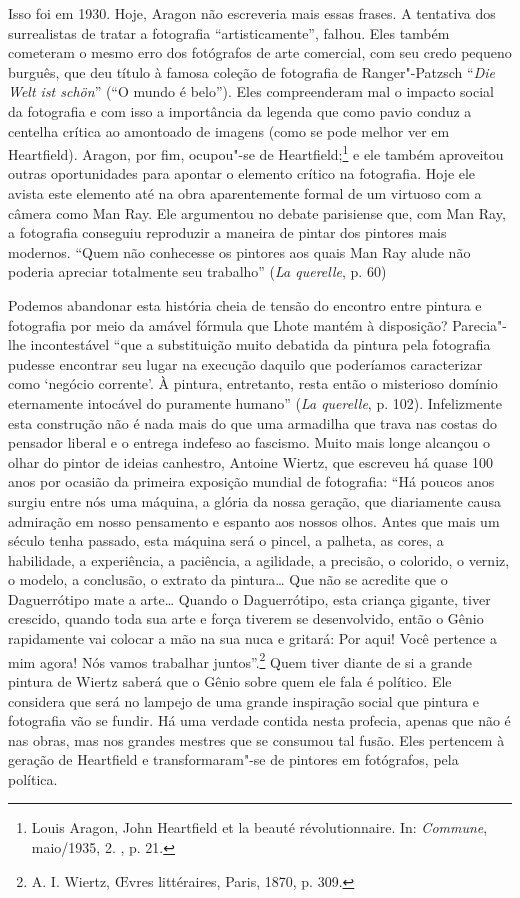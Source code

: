 Isso foi em 1930. Hoje, Aragon não escreveria mais essas frases. A
tentativa dos surrealistas de tratar a fotografia ``artisticamente'',
falhou. Eles também cometeram o mesmo erro dos fotógrafos de arte
comercial, com seu credo pequeno burguês, que deu título à famosa
coleção de fotografia de Ranger"-Patzsch ``\emph{Die Welt ist schön}''
(``O mundo é belo''). Eles compreenderam mal o impacto social da
fotografia e com isso a importância da legenda que como pavio conduz a
centelha crítica ao amontoado de imagens (como se pode melhor ver em
Heartfield). Aragon, por fim, ocupou"-se de Heartfield;\footnote{Louis
  Aragon, John Heartfield et la beauté révolutionnaire. In: \emph{Commune},
  maio/1935, 2. , p. 21.} e ele também aproveitou outras oportunidades
para apontar o elemento crítico na fotografia. Hoje ele avista este
elemento até na obra aparentemente formal de um virtuoso com a câmera
como Man Ray. Ele argumentou no debate parisiense que, com Man Ray, a
fotografia conseguiu reproduzir a maneira de pintar dos pintores mais
modernos. ``Quem não conhecesse os pintores aos quais Man Ray alude não
poderia apreciar totalmente seu trabalho'' (\emph{La querelle}, p. 60)

Podemos abandonar esta história cheia de tensão do encontro entre
pintura e fotografia por meio da amável fórmula que Lhote mantém à
disposição? Parecia"-lhe incontestável ``que a substituição muito
debatida da pintura pela fotografia pudesse encontrar seu lugar na
execução daquilo que poderíamos caracterizar como `negócio corrente'. À
pintura, entretanto, resta então o misterioso domínio eternamente
intocável do puramente humano'' (\emph{La querelle}, p. 102).
Infelizmente esta construção não é nada mais do que uma armadilha que
trava nas costas do pensador liberal e o entrega indefeso ao fascismo.
Muito mais longe alcançou o olhar do pintor de ideias canhestro, Antoine
Wiertz, que escreveu há quase 100 anos por ocasião da primeira exposição
mundial de fotografia: ``Há poucos anos surgiu entre nós uma máquina, a
glória da nossa geração, que diariamente causa admiração em nosso
pensamento e espanto aos nossos olhos. Antes que mais um século tenha
passado, esta máquina será o pincel, a palheta, as cores, a habilidade,
a experiência, a paciência, a agilidade, a precisão, o colorido, o
verniz, o modelo, a conclusão, o extrato da pintura\ldots{} Que não se
acredite que o Daguerrótipo mate a arte\ldots{} Quando o Daguerrótipo, esta
criança gigante, tiver crescido, quando toda sua arte e força tiverem se
desenvolvido, então o Gênio rapidamente vai colocar a mão na sua nuca e
gritará: Por aqui! Você pertence a mim agora! Nós vamos trabalhar
juntos''.\footnote{A. I. Wiertz, \OE vres littéraires, Paris, 1870, p. 309.}
Quem tiver diante de si a grande pintura de Wiertz saberá que o Gênio
sobre quem ele fala é político. Ele considera que será no lampejo de uma
grande inspiração social que pintura e fotografia vão se fundir. Há uma
verdade contida nesta profecia, apenas que não é nas obras, mas nos
grandes mestres que se consumou tal fusão. Eles pertencem à geração de
Heartfield e transformaram"-se de pintores em fotógrafos, pela política.

